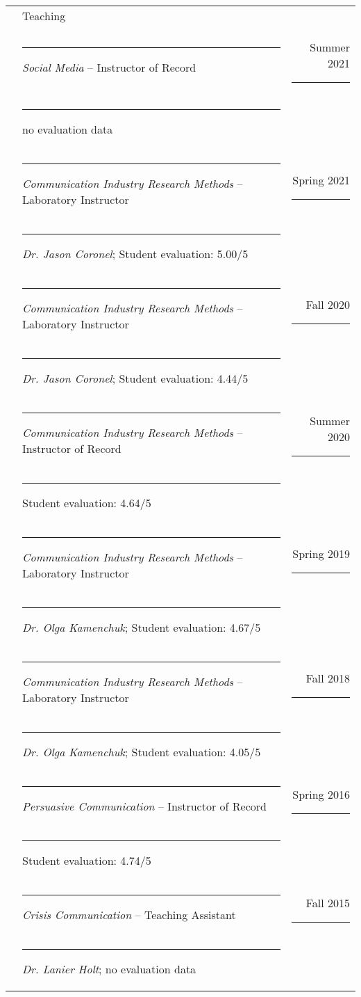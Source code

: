 \documentclass[letterpaper, 10pt]{extarticle}
\begin{document}
\begin{tabularx}{\textwidth}{lXr}
&Teaching\vspace{0.25em}\\
&\rule{1em}{0pt}\textit{Social Media} -- Instructor of Record & Summer 2021\rule{2em}{0pt}\\
&\rule{2em}{0pt}{\small no evaluation data}\vspace{.25em}\\
&\rule{1em}{0pt}\textit{Communication Industry Research Methods} -- Laboratory Instructor & Spring 2021\rule{2em}{0pt}\\
&\rule{2em}{0pt}{\small \textit{Dr. Jason Coronel}; Student evaluation: 5.00/5}\vspace{.25em}\\
&\rule{1em}{0pt}\textit{Communication Industry Research Methods} -- Laboratory Instructor & Fall 2020\rule{2em}{0pt}\\
&\rule{2em}{0pt}{\small \textit{Dr. Jason Coronel}; Student evaluation: 4.44/5}\vspace{.25em}\\
&\rule{1em}{0pt}\textit{Communication Industry Research Methods} -- Instructor of Record & Summer 2020\rule{2em}{0pt}\\
&\rule{2em}{0pt}{\small Student evaluation: 4.64/5}\vspace{.25em}\\
&\rule{1em}{0pt}\textit{Communication Industry Research Methods} -- Laboratory Instructor & Spring 2019\rule{2em}{0pt}\\
&\rule{2em}{0pt}{\small \textit{Dr. Olga Kamenchuk}; Student evaluation: 4.67/5}\vspace{.25em}\\
&\rule{1em}{0pt}\textit{Communication Industry Research Methods} -- Laboratory Instructor & Fall 2018\rule{2em}{0pt}\\
&\rule{2em}{0pt}{\small \textit{Dr. Olga Kamenchuk}; Student evaluation: 4.05/5}\vspace{.25em}\\
&\rule{1em}{0pt}\textit{Persuasive Communication} -- Instructor of Record & Spring 2016\rule{2em}{0pt}\\
&\rule{2em}{0pt}{\small Student evaluation: 4.74/5}\vspace{.25em}\\
&\rule{1em}{0pt}\textit{Crisis Communication} -- Teaching Assistant & Fall 2015\rule{2em}{0pt}\\
&\rule{2em}{0pt}{\small \textit{Dr. Lanier Holt}; no evaluation data}\\
\end{tabularx}
\end{document}
